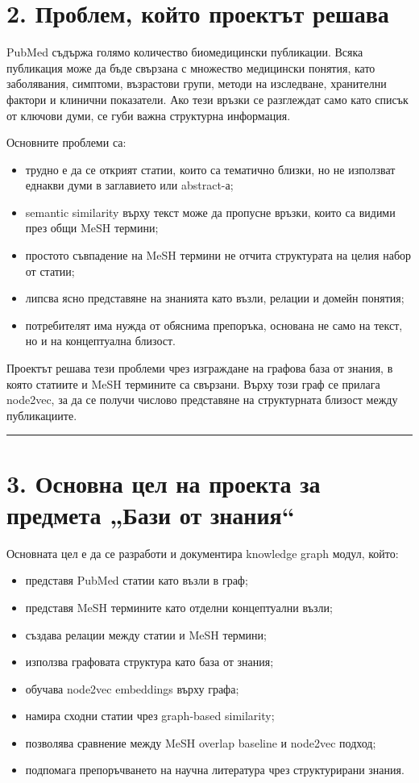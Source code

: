 \documentclass[12pt,a4paper]{article}
\providecommand{\tightlist}{\setlength{\itemsep}{0pt}\setlength{\parskip}{0pt}}
\begin{document}
\section{2. Проблем, който проектът решава}

PubMed съдържа голямо количество биомедицински публикации. Всяка публикация може да бъде свързана с множество медицински понятия, като заболявания, симптоми, възрастови групи, методи на изследване, хранителни фактори и клинични показатели. Ако тези връзки се разглеждат само като списък от ключови думи, се губи важна структурна информация.

Основните проблеми са:

\begin{itemize}
\tightlist
\item
  трудно е да се открият статии, които са тематично близки, но не използват еднакви думи в заглавието или abstract-а;
\item
  semantic similarity върху текст може да пропусне връзки, които са видими през общи MeSH термини;
\item
  простото съвпадение на MeSH термини не отчита структурата на целия набор от статии;
\item
  липсва ясно представяне на знанията като възли, релации и домейн понятия;
\item
  потребителят има нужда от обяснима препоръка, основана не само на текст, но и на концептуална близост.
\end{itemize}

Проектът решава тези проблеми чрез изграждане на графова база от знания, в която статиите и MeSH термините са свързани. Върху този граф се прилага node2vec, за да се получи числово представяне на структурната близост между публикациите.

\vspace{0.5em}\hrule\vspace{1.0em}

\section{3. Основна цел на проекта за предмета „Бази от знания“}

Основната цел е да се разработи и документира knowledge graph модул, който:

\begin{itemize}
\tightlist
\item
  представя PubMed статии като възли в граф;
\item
  представя MeSH термините като отделни концептуални възли;
\item
  създава релации между статии и MeSH термини;
\item
  използва графовата структура като база от знания;
\item
  обучава node2vec embeddings върху графа;
\item
  намира сходни статии чрез graph-based similarity;
\item
  позволява сравнение между MeSH overlap baseline и node2vec подход;
\item
  подпомага препоръчването на научна литература чрез структурирани знания.
\end{itemize}
\end{document}
